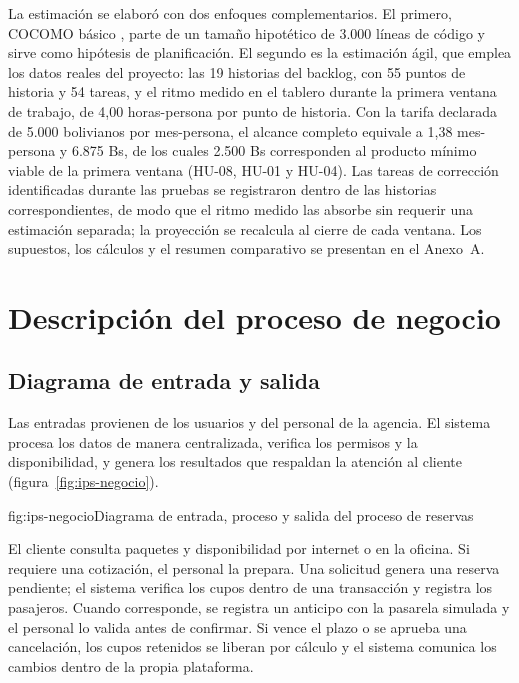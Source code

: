 La estimación se elaboró con dos enfoques complementarios. El primero,
COCOMO básico \parencite{boehm1981}, parte de un tamaño hipotético de 3.000
líneas de código y sirve como hipótesis de planificación. El segundo es la
estimación ágil, que emplea los datos reales del proyecto: las 19 historias
del backlog, con 55 puntos de historia y 54 tareas, y el ritmo medido en el
tablero durante la primera ventana de trabajo, de 4,00 horas-persona por
punto de historia. Con la tarifa declarada de 5.000 bolivianos por
mes-persona, el alcance completo equivale a 1,38 mes-persona y 6.875 Bs, de
los cuales 2.500 Bs corresponden al producto mínimo viable de la primera
ventana (HU-08, HU-01 y HU-04). Las tareas de corrección identificadas
durante las pruebas se registraron dentro de las historias correspondientes,
de modo que el ritmo medido las absorbe sin requerir una estimación
separada; la proyección se recalcula al cierre de cada ventana. Los
supuestos, los cálculos y el resumen comparativo se presentan en el Anexo~A.

\section{Descripción del proceso de negocio}

\subsection{Diagrama de entrada y salida}

Las entradas provienen de los usuarios y del personal de la agencia. El
sistema procesa los datos de manera centralizada, verifica los permisos y la
disponibilidad, y genera los resultados que respaldan la atención al cliente
(figura~\ref{fig:ips-negocio}).

\begin{figuraapa}{fig:ips-negocio}{Diagrama de entrada, proceso y salida del proceso de reservas}
\end{figuraapa}

El cliente consulta paquetes y disponibilidad por internet o en la oficina.
Si requiere una cotización, el personal la prepara. Una solicitud genera una
reserva pendiente; el sistema verifica los cupos dentro de una transacción y
registra los pasajeros. Cuando corresponde, se registra un anticipo con la
pasarela simulada y el personal lo valida antes de confirmar. Si vence el
plazo o se aprueba una cancelación, los cupos retenidos se liberan por
cálculo y el sistema comunica los cambios dentro de la propia plataforma.

